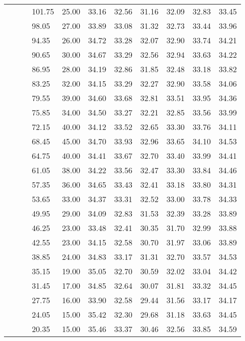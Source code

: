 \begin{longtable}{llllrrrrrrr}
   &  &  & 101.75 & 25.00 & 33.16 & 32.56 & 31.16 & 32.09 & 32.83 & 33.45 \\ 
   &  &  & 98.05 & 27.00 & 33.89 & 33.08 & 31.32 & 32.73 & 33.44 & 33.96 \\ 
   &  &  & 94.35 & 26.00 & 34.72 & 33.28 & 32.07 & 32.90 & 33.74 & 34.21 \\ 
   &  &  & 90.65 & 30.00 & 34.67 & 33.29 & 32.56 & 32.94 & 33.63 & 34.22 \\ 
   &  &  & 86.95 & 28.00 & 34.19 & 32.86 & 31.85 & 32.48 & 33.18 & 33.82 \\ 
   &  &  & 83.25 & 32.00 & 34.15 & 33.29 & 32.27 & 32.90 & 33.58 & 34.06 \\ 
   &  &  & 79.55 & 39.00 & 34.60 & 33.68 & 32.81 & 33.51 & 33.95 & 34.36 \\ 
   &  &  & 75.85 & 34.00 & 34.50 & 33.27 & 32.21 & 32.85 & 33.56 & 33.99 \\ 
   &  &  & 72.15 & 40.00 & 34.12 & 33.52 & 32.65 & 33.30 & 33.76 & 34.11 \\ 
   &  &  & 68.45 & 45.00 & 34.70 & 33.93 & 32.96 & 33.65 & 34.10 & 34.53 \\ 
   &  &  & 64.75 & 40.00 & 34.41 & 33.67 & 32.70 & 33.40 & 33.99 & 34.41 \\ 
   &  &  & 61.05 & 38.00 & 34.22 & 33.56 & 32.47 & 33.30 & 33.84 & 34.46 \\ 
   &  &  & 57.35 & 36.00 & 34.65 & 33.43 & 32.41 & 33.18 & 33.80 & 34.31 \\ 
   &  &  & 53.65 & 33.00 & 34.37 & 33.31 & 32.52 & 33.00 & 33.78 & 34.33 \\ 
   &  &  & 49.95 & 29.00 & 34.09 & 32.83 & 31.53 & 32.39 & 33.28 & 33.89 \\ 
   &  &  & 46.25 & 23.00 & 33.48 & 32.41 & 30.35 & 31.70 & 32.99 & 33.88 \\ 
   &  &  & 42.55 & 23.00 & 34.15 & 32.58 & 30.70 & 31.97 & 33.06 & 33.89 \\ 
   &  &  & 38.85 & 24.00 & 34.83 & 33.17 & 31.31 & 32.70 & 33.57 & 34.53 \\ 
   &  &  & 35.15 & 19.00 & 35.05 & 32.70 & 30.59 & 32.02 & 33.04 & 34.42 \\ 
   &  &  & 31.45 & 17.00 & 34.85 & 32.64 & 30.07 & 31.81 & 33.32 & 34.45 \\ 
   &  &  & 27.75 & 16.00 & 33.90 & 32.58 & 29.44 & 31.56 & 33.17 & 34.17 \\ 
   &  &  & 24.05 & 15.00 & 35.42 & 32.30 & 29.68 & 31.18 & 33.63 & 34.45 \\ 
   &  &  & 20.35 & 15.00 & 35.46 & 33.37 & 30.46 & 32.56 & 33.85 & 34.59 \\ 

\end{longtable}
